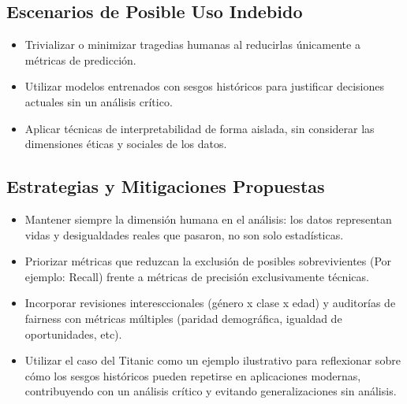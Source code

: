 \documentclass[conference]{IEEEtran}
\begin{document}
\subsection*{Escenarios de Posible Uso Indebido}
\begin{itemize}
    \item Trivializar o minimizar tragedias humanas al reducirlas únicamente a métricas de predicción.
    \item Utilizar modelos entrenados con sesgos históricos para justificar decisiones actuales sin un análisis crítico.
    \item Aplicar técnicas de interpretabilidad de forma aislada, sin considerar las dimensiones éticas y sociales de los datos.
\end{itemize}

\subsection*{Estrategias y Mitigaciones Propuestas}
\begin{itemize}
    \item Mantener siempre la dimensión humana en el análisis: los datos representan vidas y desigualdades reales que pasaron, no son solo estadísticas.
    \item Priorizar métricas que reduzcan la exclusión de posibles sobrevivientes (Por ejemplo: Recall) frente a métricas de precisión exclusivamente técnicas.
    \item Incorporar revisiones interesccionales (género x clase x edad) y auditorías de fairness con métricas múltiples (paridad demográfica, igualdad de oportunidades, etc).
    \item Utilizar el caso del Titanic como un ejemplo ilustrativo para reflexionar sobre cómo los sesgos históricos pueden repetirse en aplicaciones modernas, contribuyendo con un análisis crítico y evitando generalizaciones sin análisis.

\end{itemize}
\end{document}
